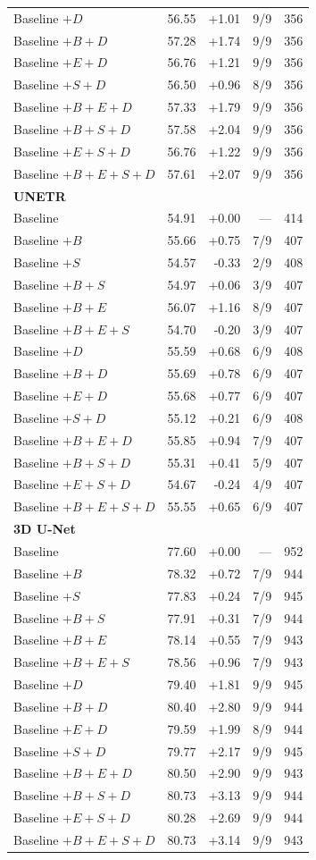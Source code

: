 \documentclass[12pt,a4paper]{article}
\begin{document}
\begin{longtable}{@{}lrrrr@{}}
Baseline $+D$ & 56.55 & +1.01 & 9/9 & 356 \\
Baseline $+B+D$ & 57.28 & +1.74 & 9/9 & 356 \\
Baseline $+E+D$ & 56.76 & +1.21 & 9/9 & 356 \\
Baseline $+S+D$ & 56.50 & +0.96 & 8/9 & 356 \\
Baseline $+B+E+D$ & 57.33 & +1.79 & 9/9 & 356 \\
Baseline $+B+S+D$ & 57.58 & +2.04 & 9/9 & 356 \\
Baseline $+E+S+D$ & 56.76 & +1.22 & 9/9 & 356 \\
Baseline $+B+E+S+D$ & 57.61 & +2.07 & 9/9 & 356 \\
\multicolumn{5}{l}{\textbf{UNETR}}\\[.3em]
Baseline & 54.91 & +0.00 & --- & 414 \\
Baseline $+B$ & 55.66 & +0.75 & 7/9 & 407 \\
Baseline $+S$ & 54.57 & -0.33 & 2/9 & 408 \\
Baseline $+B+S$ & 54.97 & +0.06 & 3/9 & 407 \\
Baseline $+B+E$ & 56.07 & +1.16 & 8/9 & 407 \\
Baseline $+B+E+S$ & 54.70 & -0.20 & 3/9 & 407 \\
Baseline $+D$ & 55.59 & +0.68 & 6/9 & 408 \\
Baseline $+B+D$ & 55.69 & +0.78 & 6/9 & 407 \\
Baseline $+E+D$ & 55.68 & +0.77 & 6/9 & 407 \\
Baseline $+S+D$ & 55.12 & +0.21 & 6/9 & 408 \\
Baseline $+B+E+D$ & 55.85 & +0.94 & 7/9 & 407 \\
Baseline $+B+S+D$ & 55.31 & +0.41 & 5/9 & 407 \\
Baseline $+E+S+D$ & 54.67 & -0.24 & 4/9 & 407 \\
Baseline $+B+E+S+D$ & 55.55 & +0.65 & 6/9 & 407 \\
\multicolumn{5}{l}{\textbf{3D U-Net}}\\[.3em]
Baseline & 77.60 & +0.00 & --- & 952 \\
Baseline $+B$ & 78.32 & +0.72 & 7/9 & 944 \\
Baseline $+S$ & 77.83 & +0.24 & 7/9 & 945 \\
Baseline $+B+S$ & 77.91 & +0.31 & 7/9 & 944 \\
Baseline $+B+E$ & 78.14 & +0.55 & 7/9 & 943 \\
Baseline $+B+E+S$ & 78.56 & +0.96 & 7/9 & 943 \\
Baseline $+D$ & 79.40 & +1.81 & 9/9 & 945 \\
Baseline $+B+D$ & 80.40 & +2.80 & 9/9 & 944 \\
Baseline $+E+D$ & 79.59 & +1.99 & 8/9 & 944 \\
Baseline $+S+D$ & 79.77 & +2.17 & 9/9 & 945 \\
Baseline $+B+E+D$ & 80.50 & +2.90 & 9/9 & 943 \\
Baseline $+B+S+D$ & 80.73 & +3.13 & 9/9 & 944 \\
Baseline $+E+S+D$ & 80.28 & +2.69 & 9/9 & 944 \\
Baseline $+B+E+S+D$ & 80.73 & +3.14 & 9/9 & 943 \\
\end{longtable}
\end{document}
